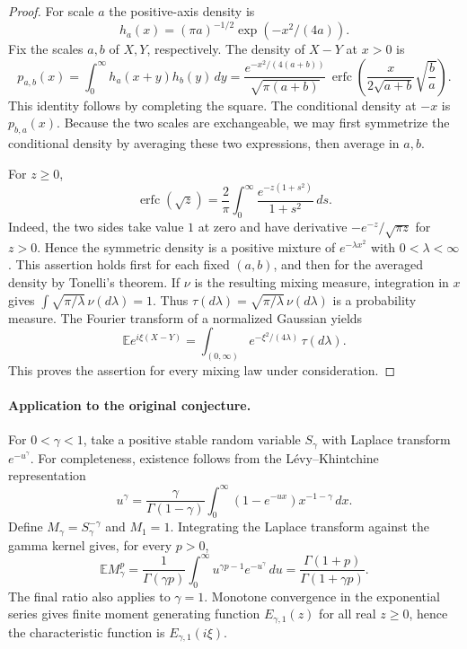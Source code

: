 \documentclass[11pt,a4paper]{article}
\numberwithin{equation}{section}
\begin{document}
\begin{proof}
For scale $a$ the positive-axis density is
\[
 h_a(x)=(\pi a)^{-1/2}\exp(-x^2/(4a)).
\]
Fix the scales $a,b$ of $X,Y$, respectively. The density of $X-Y$ at $x>0$ is
\[
 p_{a,b}(x)=\int_0^\infty h_a(x+y)h_b(y)\,dy
 =\frac{e^{-x^2/(4(a+b))}}{\sqrt{\pi(a+b)}}\,
 \operatorname{erfc}\!\left(\frac{x}{2\sqrt{a+b}}\sqrt{\frac ba}\right).
\]
This identity follows by completing the square. The conditional density at $-x$ is $p_{b,a}(x)$. Because the two scales are exchangeable, we may first symmetrize the conditional density by averaging these two expressions, then average in $a,b$.

For $z\ge0$,
\[
 \operatorname{erfc}(\sqrt z)=\frac2\pi\int_0^\infty
 \frac{e^{-z(1+s^2)}}{1+s^2}\,ds.
\]
Indeed, the two sides take value $1$ at zero and have derivative $-e^{-z}/\sqrt{\pi z}$ for $z>0$. Hence the symmetric density is a positive mixture of $e^{-\lambda x^2}$ with $0<\lambda<\infty$. This assertion holds first for each fixed $(a,b)$, and then for the averaged density by Tonelli's theorem. If $\nu$ is the resulting mixing measure, integration in $x$ gives $\int\sqrt{\pi/\lambda}\,\nu(d\lambda)=1$. Thus $\tau(d\lambda)=\sqrt{\pi/\lambda}\,\nu(d\lambda)$ is a probability measure. The Fourier transform of a normalized Gaussian yields
\[
 \mathbb E e^{i\xi(X-Y)}
  =\int_{(0,\infty)}e^{-\xi^2/(4\lambda)}\,\tau(d\lambda).
\]
This proves the assertion for every mixing law under consideration.
\end{proof}

\paragraph{Application to the original conjecture.}
For $0<\gamma<1$, take a positive stable random variable $S_\gamma$ with Laplace transform $e^{-u^\gamma}$. For completeness, existence follows from the Lévy--Khintchine representation
\[
 u^\gamma=\frac{\gamma}{\Gamma(1-\gamma)}
 \int_0^\infty(1-e^{-ux})x^{-1-\gamma}\,dx.
\]
Define $M_\gamma=S_\gamma^{-\gamma}$ and $M_1=1$. Integrating the Laplace transform against the gamma kernel gives, for every $p>0$,
\[
 \mathbb E M_\gamma^p=
 \frac{1}{\Gamma(\gamma p)}\int_0^\infty u^{\gamma p-1}e^{-u^\gamma}\,du
 =\frac{\Gamma(1+p)}{\Gamma(1+\gamma p)}.
\]
The final ratio also applies to $\gamma=1$. Monotone convergence in the exponential series gives finite moment generating function $E_{\gamma,1}(z)$ for all real $z\ge0$, hence the characteristic function is $E_{\gamma,1}(i\xi)$.
\end{document}
